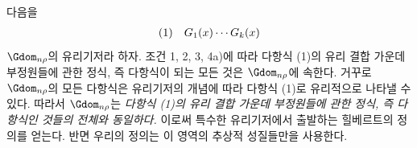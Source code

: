 
다음을
\[
\begin{array}{@{}l@{\quad}c@{}}
(1)& G_1(x)\cdots G_k(x)
\end{array}
\]
$\Gdom_{n\rho}$의 유리기저라 하자. 조건 1, 2, 3, 4a)에 따라 다항식 (1)의 유리 결합 가운데 부정원들에 관한 정식, 즉 다항식이 되는 모든 것은 $\Gdom_{n\rho}$에 속한다. 거꾸로 $\Gdom_{n\rho}$의 모든 다항식은 유리기저의 개념에 따라 다항식 (1)로 유리적으로 나타낼 수 있다. 따라서 $\Gdom_{n\rho}$는 \emph{다항식 (1)의 유리 결합 가운데 부정원들에 관한 정식, 즉 다항식인 것들의 전체와 동일하다.} 이로써 특수한 유리기저에서 출발하는 힐베르트의 정의를 얻는다. 반면 우리의 정의는 이 영역의 추상적 성질들만을 사용한다.
